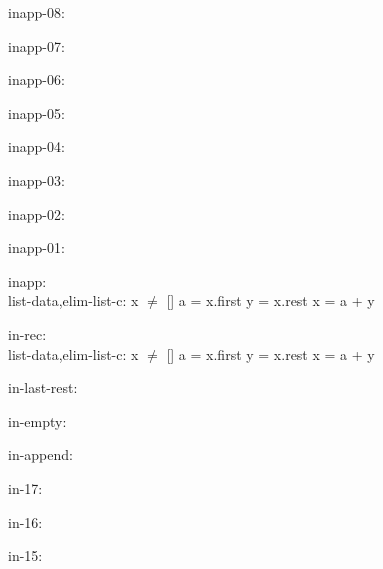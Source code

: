 \documentclass[a4paper]{article}
\begin{document}
\bigskip

inapp-08:\\ 

\bigskip

inapp-07:\\ 

\bigskip

inapp-06:\\ 

\bigskip

inapp-05:\\ 

\bigskip

inapp-04:\\ 

\bigskip

inapp-03:\\ 

\bigskip

inapp-02:\\ 

\bigskip

inapp-01:\\ 

\bigskip

inapp:\\ list-data,elim-list-c: 
x $\neq$ []
 \Fol a = x.first \And y = x.rest \Equiv x = a + y



\bigskip

in-rec:\\ list-data,elim-list-c: 
x $\neq$ []
 \Fol a = x.first \And y = x.rest \Equiv x = a + y



\bigskip

in-last-rest:\\ 

\bigskip

in-empty:\\ 

\bigskip

in-append:\\ 

\bigskip

in-17:\\ 

\bigskip

in-16:\\ 

\bigskip

in-15:\\ 

\bigskip
\end{document}
